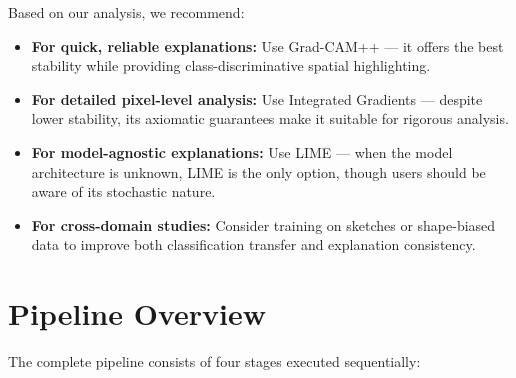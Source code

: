 \documentclass[12pt, a4paper]{article}
\begin{document}
Based on our analysis, we recommend:

\begin{itemize}[leftmargin=*]
    \item \textbf{For quick, reliable explanations:} Use Grad-CAM++ --- it
          offers the best stability while providing class-discriminative
          spatial highlighting.
    \item \textbf{For detailed pixel-level analysis:} Use Integrated Gradients
          --- despite lower stability, its axiomatic guarantees make it
          suitable for rigorous analysis.
    \item \textbf{For model-agnostic explanations:} Use LIME --- when the
          model architecture is unknown, LIME is the only option, though
          users should be aware of its stochastic nature.
    \item \textbf{For cross-domain studies:} Consider training on sketches or
          shape-biased data to improve both classification transfer and
          explanation consistency.
\end{itemize}


\section{Pipeline Overview}
\label{sec:pipeline}

The complete pipeline consists of four stages executed sequentially:
\end{document}
